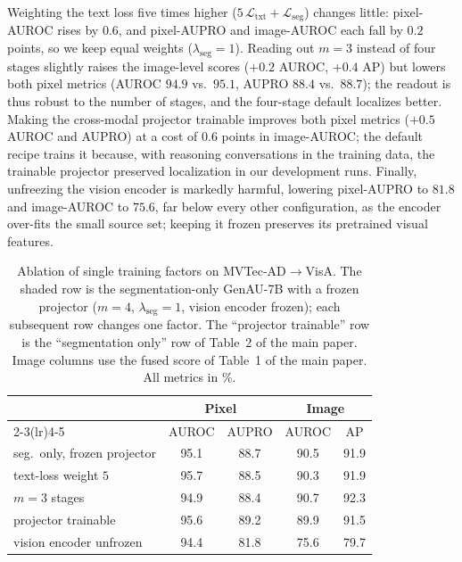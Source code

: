 Weighting the text loss five times higher ($5\,\mathcal{L}_{\mathrm{txt}}+\mathcal{L}_{\mathrm{seg}}$) changes little: pixel-AUROC rises by $0.6$, and pixel-AUPRO and image-AUROC each fall by $0.2$ points, so we keep equal weights ($\lambda_{\mathrm{seg}}=1$). Reading out $m=3$ instead of four stages slightly raises the image-level scores ($+0.2$ AUROC, $+0.4$ AP) but lowers both pixel metrics (AUROC $94.9$ vs.\ $95.1$, AUPRO $88.4$ vs.\ $88.7$); the readout is thus robust to the number of stages, and the four-stage default localizes better. Making the cross-modal projector trainable improves both pixel metrics ($+0.5$ AUROC and AUPRO) at a cost of $0.6$ points in image-AUROC; the default recipe trains it because, with reasoning conversations in the training data, the trainable projector preserved localization in our development runs. Finally, unfreezing the vision encoder is markedly harmful, lowering pixel-AUPRO to $81.8$ and image-AUROC to $75.6$, far below every other configuration, as the encoder over-fits the small source set; keeping it frozen preserves its pretrained visual features.

\begin{table}[h]
\centering
\small
\setlength{\tabcolsep}{3pt}
\caption{Ablation of single training factors on MVTec-AD$\rightarrow$VisA. The shaded row is the segmentation-only GenAU-7B with a frozen projector ($m{=}4$, $\lambda_{\mathrm{seg}}{=}1$, vision encoder frozen); each subsequent row changes one factor. The ``projector trainable'' row is the ``segmentation only'' row of Table~2 of the main paper. Image columns use the fused score of Table~1 of the main paper. All metrics in \%.}
\label{tab:ablations}
\begin{tabular}{@{}l|cc|cc@{}}
\toprule
 & \multicolumn{2}{c|}{\textbf{Pixel}} & \multicolumn{2}{c}{\textbf{Image}} \\
\cmidrule(lr){2-3}\cmidrule(lr){4-5}
 & AUROC & AUPRO & AUROC & AP \\
\midrule
\rowcolor{gray!20}
seg.\ only, frozen projector & 95.1 & 88.7 & 90.5 & 91.9 \\
\midrule
\quad text-loss weight $5$    & 95.7 & 88.5 & 90.3 & 91.9 \\
\quad $m = 3$ stages          & 94.9 & 88.4 & 90.7 & 92.3 \\
\quad projector trainable     & 95.6 & 89.2 & 89.9 & 91.5 \\
\quad vision encoder unfrozen & 94.4 & 81.8 & 75.6 & 79.7 \\
\bottomrule
\end{tabular}
\end{table}

